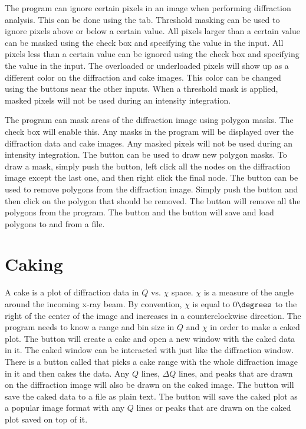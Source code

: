 The program can ignore certain pixels in an image
when performing diffraction analysis. This can be done
using the  tab.  Threshold masking can be 
used to ignore pixels above or below a certain value.
All pixels larger than a certain value can be masked 
using the  check box
and specifying the value in the 
 input.
All pixels less than a certain value can be ignored 
using the  check box 
and specifying the value in the 
 input.
The overloaded or underloaded pixels will show up
as a different color on the diffraction and cake images.
This color can be changed using the  buttons
near the other inputs.
When a threshold mask is applied, masked pixels
will not be used during an intensity integration.

The program can mask areas of the diffraction image
using polygon masks. The  check box 
will enable this. Any masks in the program
will be displayed over the diffraction data and cake images.
Any masked pixels will not be used during an intensity
integration. The  button can be used to 
draw new polygon masks. To draw a mask, simply push
the button, left click all the
nodes on the diffraction image except the last one, and
then right click the final node. 
The  button can be used to 
remove polygons from the diffraction image. Simply push
the button and then click on the polygon that should be
removed. The  button will remove all
the polygons from the program. The  button
and the  button will save and load
polygons to and from a file.

\section{Caking}
\index{$\chi$}

A cake is a plot of diffraction data in $Q$ vs.
$\chi$ space. $\chi$ is a measure of the angle around 
the incoming x-ray beam. By convention, $\chi$ is equal to 
$0\degrees$ to the right of the center of the image and
increases in a counterclockwise direction. 
The program needs to know a range and bin size in $Q$ and
$\chi$ in order to make a caked plot. The  button
will create a cake and open a new window with the caked data in
it. The caked window can be interacted with just like
the diffraction window. There is a button called  that 
picks a cake range with the whole diffraction image in it 
and then cakes the data. Any $Q$ lines, $\Delta Q$ lines,
and peaks that are drawn on the diffraction image
will also be drawn on the caked image.
The  button will save the caked data
to a file as plain text. The  button will save the
caked plot as a popular image format with
any $Q$ lines or peaks that are drawn on 
the caked plot saved on top of it.

